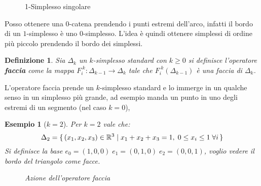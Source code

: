 \documentclass[10pt, twoside=false, x11names]{scrbook}
\newtheorem{definition}[theorem]{Definizione}
\newtheorem{example}[theorem]{Esempio}
\newcommand{\RN}[1][]{\mathbb{R}^#1}
\begin{document}
\begin{figure}[htbp]
  \centering
  \caption{1-Simplesso singolare}
  \label{fig:lez1:1_standard_simplex_with_arc}
\end{figure}

Posso ottenere una $ 0 $-catena prendendo i punti estremi dell'arco, infatti il bordo di un $ 1 $-simplesso
è uno $ 0 $-simplesso. L'idea è quindi ottenere simplessi di ordine più piccolo prendendo il
bordo dei simplessi.

\begin{definition}
  Sia $ \Delta_k $ un $ k $-simplesso standard con $ k \geq 0 $ si definisce l'operatore \textbf{faccia}
  come la mappa $ F_i^{\;k}: \Delta_{k-1} \to \Delta_k $ tale che $ F_i^{\;k}(\Delta_{k-1}) $ è una faccia di $ \Delta_k $.
\end{definition}
L'operatore faccia prende un $ k $-simplesso standard e lo immerge in un qualche senso in un
simplesso più grande, ad esempio manda un punto in uno degli estremi di un segmento (nel caso $ k = 0 $),

\begin{example}[$ k = 2 $]
  Per $ k = 2 $ vale che:
  \[
    \Delta_2 = \set{ (x_1,x_2,x_3) \in \RN{3} | x_1 + x_2 + x_3 = 1, \; 0 \leq x_i \leq 1 \; \forall i}
  \]
  Si definisce la base $ e_0 = (1,0,0) \; e_1 = (0,1,0) \; e_2 = (0,0,1) $, voglio vedere il bordo del triangolo
  come facce.

  \begin{figure}[htbp]
    \centering
    \caption{Azione dell'operatore faccia}
    \label{fig:lez1:standard_simplex_faces}
  \end{figure}
\end{example}
\end{document}
